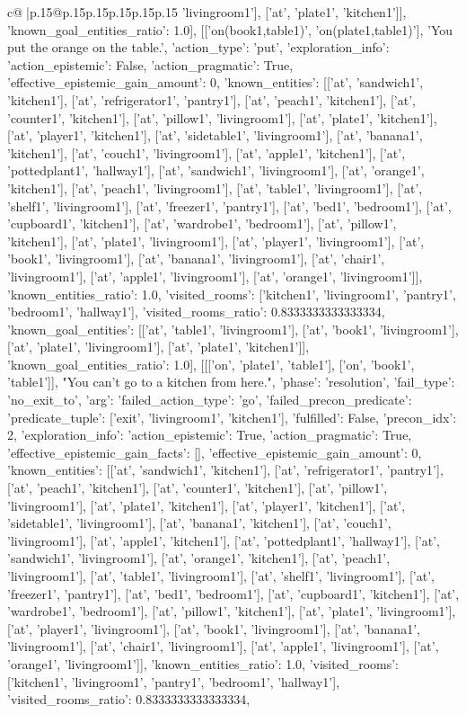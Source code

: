 \documentclass{article}
\begin{document}
{\begin{supertabular}{c@{$\;$}|p{.15\linewidth}@{}p{.15\linewidth}p{.15\linewidth}p{.15\linewidth}p{.15\linewidth}p{.15\linewidth}}
{{{'livingroom1'], ['at', 'plate1', 'kitchen1']], 'known_goal_entities_ratio': 1.0}}], [['on(book1,table1)', 'on(plate1,table1)'], 'You put the orange on the table.\n', {'action_type': 'put', 'exploration_info': {'action_epistemic': False, 'action_pragmatic': True, 'effective_epistemic_gain_amount': 0, 'known_entities': [['at', 'sandwich1', 'kitchen1'], ['at', 'refrigerator1', 'pantry1'], ['at', 'peach1', 'kitchen1'], ['at', 'counter1', 'kitchen1'], ['at', 'pillow1', 'livingroom1'], ['at', 'plate1', 'kitchen1'], ['at', 'player1', 'kitchen1'], ['at', 'sidetable1', 'livingroom1'], ['at', 'banana1', 'kitchen1'], ['at', 'couch1', 'livingroom1'], ['at', 'apple1', 'kitchen1'], ['at', 'pottedplant1', 'hallway1'], ['at', 'sandwich1', 'livingroom1'], ['at', 'orange1', 'kitchen1'], ['at', 'peach1', 'livingroom1'], ['at', 'table1', 'livingroom1'], ['at', 'shelf1', 'livingroom1'], ['at', 'freezer1', 'pantry1'], ['at', 'bed1', 'bedroom1'], ['at', 'cupboard1', 'kitchen1'], ['at', 'wardrobe1', 'bedroom1'], ['at', 'pillow1', 'kitchen1'], ['at', 'plate1', 'livingroom1'], ['at', 'player1', 'livingroom1'], ['at', 'book1', 'livingroom1'], ['at', 'banana1', 'livingroom1'], ['at', 'chair1', 'livingroom1'], ['at', 'apple1', 'livingroom1'], ['at', 'orange1', 'livingroom1']], 'known_entities_ratio': 1.0, 'visited_rooms': ['kitchen1', 'livingroom1', 'pantry1', 'bedroom1', 'hallway1'], 'visited_rooms_ratio': 0.8333333333333334, 'known_goal_entities': [['at', 'table1', 'livingroom1'], ['at', 'book1', 'livingroom1'], ['at', 'plate1', 'livingroom1'], ['at', 'plate1', 'kitchen1']], 'known_goal_entities_ratio': 1.0}}], [[['on', 'plate1', 'table1'], ['on', 'book1', 'table1']], "You can't go to a kitchen from here.\n", {'phase': 'resolution', 'fail_type': 'no_exit_to', 'arg': {'failed_action_type': 'go', 'failed_precon_predicate': {'predicate_tuple': ['exit', 'livingroom1', 'kitchen1'], 'fulfilled': False, 'precon_idx': 2}}, 'exploration_info': {'action_epistemic': True, 'action_pragmatic': True, 'effective_epistemic_gain_facts': [], 'effective_epistemic_gain_amount': 0, 'known_entities': [['at', 'sandwich1', 'kitchen1'], ['at', 'refrigerator1', 'pantry1'], ['at', 'peach1', 'kitchen1'], ['at', 'counter1', 'kitchen1'], ['at', 'pillow1', 'livingroom1'], ['at', 'plate1', 'kitchen1'], ['at', 'player1', 'kitchen1'], ['at', 'sidetable1', 'livingroom1'], ['at', 'banana1', 'kitchen1'], ['at', 'couch1', 'livingroom1'], ['at', 'apple1', 'kitchen1'], ['at', 'pottedplant1', 'hallway1'], ['at', 'sandwich1', 'livingroom1'], ['at', 'orange1', 'kitchen1'], ['at', 'peach1', 'livingroom1'], ['at', 'table1', 'livingroom1'], ['at', 'shelf1', 'livingroom1'], ['at', 'freezer1', 'pantry1'], ['at', 'bed1', 'bedroom1'], ['at', 'cupboard1', 'kitchen1'], ['at', 'wardrobe1', 'bedroom1'], ['at', 'pillow1', 'kitchen1'], ['at', 'plate1', 'livingroom1'], ['at', 'player1', 'livingroom1'], ['at', 'book1', 'livingroom1'], ['at', 'banana1', 'livingroom1'], ['at', 'chair1', 'livingroom1'], ['at', 'apple1', 'livingroom1'], ['at', 'orange1', 'livingroom1']], 'known_entities_ratio': 1.0, 'visited_rooms': ['kitchen1', 'livingroom1', 'pantry1', 'bedroom1', 'hallway1'], 'visited_rooms_ratio': 0.8333333333333334, }}}
\end{supertabular}}
\end{document}
